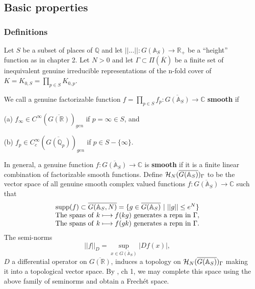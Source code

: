 \subsection{Basic properties}

\subsubsection{Definitions}

Let $S$ be a subset of places of ${\mathbb{Q}}$ and let
$||...||:G({\mathbb{A}}_S)\rightarrow {\mathbb{R}}_+$ be a ``height'' function
as in chapter 2. Let $N>0$ and let
$\Gamma\subset \Pi(\overline{K})$
be a finite set of inequivalent genuine irreducible representations
of the n-fold cover of $K=K_{0,S}=\prod_{p\in S}K_{0,p}$.

We call a genuine factorizable function
$f=\prod_{p\in S}f_p:\overline{G({\mathbb{A}}_S)}\rightarrow {\mathbb{C}}$
{\bf smooth} if

(a) $f_\infty\in C^\infty(\overline{G({\mathbb{R}})})_{gen}$
if $p=\infty \in S$, and

(b) $f_p\in C_c^\infty(\overline{G({\mathbb{Q}}_p)})_{gen}$
if $p\in S-\{\infty\}$.

\noindent
In general, a genuine
function $f:\overline{G({\mathbb{A}}_S)}\rightarrow {\mathbb{C}}$
is {\bf smooth} if it is a finite linear combination of factorizable smooth
functions. Define
${\cal{H}}_N(\overline{G({\mathbb{A}}_S)})_\Gamma$
to be the vector space of
all genuine smooth complex valued functions
$f:\overline{G({\mathbb{A}}_S)}\rightarrow {\mathbb{C}}$
such that
\begin{equation}
\begin{array}{c}
{\rm supp}(f)\subset \overline{G({\mathbb{A}}_S,N)}
=\{ g\in \overline{G({\mathbb{A}}_S)}\ |\ ||g||\leq e^N\}\\
{\rm The \ spans\ of\ }
k\longmapsto f(kg){\rm \ generates\ a \ repn\ in\ }\Gamma,\\
{\rm The \ spans\ of\ }
k\longmapsto f(gk){\rm \ generates\ a \ repn\ in\ }\Gamma .
\end{array}
\end{equation}
The semi-norms
\[
||f||_D=\sup_{x\in \overline{G({\mathbb{A}}_S)}} |Df(x)|,
\]
$D$ a differential operator on $\overline{G({\mathbb{R}})}$,
induces a topology on
${\cal{H}}_N(\overline{G({\mathbb{A}}_S)})_\Gamma$
making it into a topological
vector space. By \cite{Ru}, ch 1,
we may complete this space using the above
family of seminorms and obtain a Frech\'et space.

